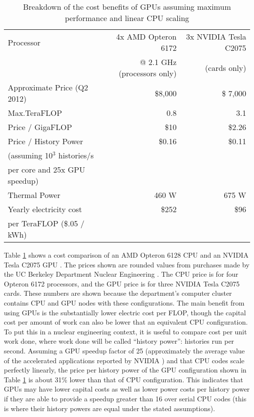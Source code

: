 \begin{table}[h]
\centering
\caption[Breakdown of the cost benefits of GPUs assuming maximum performance and linear CPU scaling]{Breakdown of the cost benefits of GPUs assuming maximum performance and linear CPU scaling \cite{cost_sheets1,cost_sheets2,c2075,opterondate,opteronperformance}}
\label{gpu_money}
\begin{tabular}{| l | r | r |}
\hline
Processor & 4x AMD Opteron 6172  & 3x NVIDIA Tesla C2075 \\
  & @ 2.1 GHz (processors only) &  (cards only)  \\
\hline
\hline
Approximate Price (Q2 2012)& \$8,000 & \$ 7,000 \\
\hline
Max.TeraFLOP & 0.8 & 3.1 \\
\hline
Price / GigaFLOP & \$10 & \$2.26 \\
\hline
Price / History Power & \$0.16 & \$0.11 \\
(assuming 10$^3$ histories/s & & \\
per core and 25x GPU speedup) & & \\
\hline
Thermal Power & 460 W & 675 W \\
\hline
Yearly electricity cost & \$252  & \$96  \\
per TeraFLOP (\$.05 / kWh)   & & \\
\hline
\end{tabular}
\end{table}

Table \ref{gpu_money} shows a cost comparison of an AMD Opteron 6128 CPU and an NVIDIA Tesla C2075 GPU \cite{cpu_latency,cuda}.  The prices shown are rounded values from purchases made by the UC Berkeley Department Nuclear Engineering \cite{cost_sheets1,cost_sheets2}.  The CPU price is for four Opteron 6172 processors, and the GPU price is for three NVIDIA Tesla C2075 cards.  These numbers are shown because the department's computer cluster contains CPU and GPU nodes with these configurations.  The main benefit from using GPUs is the substantially lower electric cost per FLOP, though the capital cost per amount of work can also be lower that an equivalent CPU configuration.  To put this in a nuclear engineering context, it is useful to compare cost per unit work done, where work done will be called ``history power'': histories run per second.  Assuming a GPU speedup factor of 25 (approximately the average value of the accelerated applications reported by NVIDIA \cite{nvidia_speedups}) and that CPU codes scale perfectly linearly, the price per history power of the GPU configuration shown in Table \ref{gpu_money} is about 31\% lower than that of CPU configuration.  This indicates that GPUs may have lower capital costs as well as lower power costs per history power if they are able to provide a speedup greater than 16 over serial CPU codes (this is where their history powers are equal under the stated assumptions). 

